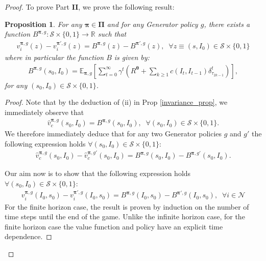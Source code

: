 \documentclass{article}
\newtheorem{proposition}{Proposition}
\begin{document}
\begin{proof}
To prove Part \textbf{II}, we prove the following result:
\begin{proposition}\label{dpg_proposition}
For any $\boldsymbol{\pi}\in\boldsymbol{\Pi}$ and for any {\selectfont Generator} policy $g$, there exists a function $B^{\boldsymbol{\pi},g}:\mathcal{S}\times \{0,1\}\to \mathbb{R}$ such that
\begin{align}
 v^{\boldsymbol{\pi},g}_i(z)-v^{\boldsymbol{\pi'},g}_i(z)
=B^{\boldsymbol{\pi},g}(z)-B^{\boldsymbol{\pi'},g}(z),\;\;\forall z\equiv (s,I_0)\in\mathcal{S}\times \{0,1\}\label{potential_relation_proof}
\end{align}
where in particular the function $B$ is given by:
\begin{align}
B^{\boldsymbol{\pi},g}(s_0,I_0) =\mathbb{E}_{\boldsymbol{\pi},g}\left[ \sum_{t=0}^\infty \gamma^t\left(R^{\boldsymbol{\theta}} +\sum_{k\geq 1} c(I_t,I_{t-1})\delta^t_{\tau_{2k-1}}\right)\right],\end{align}
for any $(s_0,I_0)\in\mathcal{S}\times \{0,1\}$.
\end{proposition}
\begin{proof}


Note that by the deduction of (ii) in Prop \ref{invariance_prop},  we immediately observe that
\begin{align}
    \hat{v}^{\boldsymbol{\pi},g}_c(s_0,I_0)=B^{\boldsymbol{\pi},g}(s_0,I_0), \;\; \forall (s_0,I_0)\in\mathcal{S}\times\{0,1\}.
\end{align}
We therefore immediately deduce that for any two {\selectfont Generator} policies $g$ and $g'$ the following expression holds $\forall (s_0,I_0)\in\mathcal{S}\times\{0,1\}$:
\begin{align}
    \hat{v}^{\boldsymbol{\pi},g}_c(s_0,I_0)-\hat{v}^{\boldsymbol{\pi},g'}_c(s_0,I_0)=B^{\boldsymbol{\pi},g}(s_0,I_0)-B^{\boldsymbol{\pi},g'}(s_0,I_0).
\end{align}

Our aim now is to show that the following expression holds $\forall (s_0,I_0)\in\mathcal{S}\times\{0,1\}$:
\begin{align}\nonumber
 v^{\boldsymbol{\pi},g}_{i}(I_{0},s_{0})-v^{\boldsymbol{\pi'},g}_{i}(I_{0},s_{0})=B^{\boldsymbol{\pi},g}(I_{0},s_{0})-B^{\boldsymbol{\pi'},g}(I_{0},s_{0}),\;\; \forall i \in\mathcal{N}
\end{align}
For the finite horizon case, the result is proven by induction on the number of time steps until the end of the game. Unlike the infinite horizon case, for the finite horizon case the value function and policy have an explicit time dependence. 



\end{proof}
\end{proof}
\end{document}

